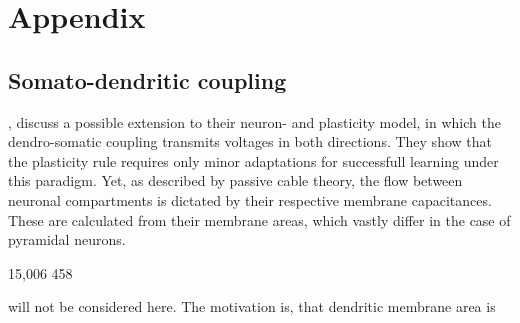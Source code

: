 
\chapter{Appendix}



\section{Somato-dendritic coupling}\label{sec-somato-dendr}

\cite{urbanczik2014learning}, discuss a possible extension to their neuron- and plasticity
model, in which the dendro-somatic coupling transmits voltages in both directions. They show
that the plasticity rule requires only minor adaptations for successfull learning under this paradigm. Yet, as described
by passive cable theory, the flow between neuronal compartments is dictated by their respective membrane capacitances.
These are calculated from their membrane areas, which vastly differ in the case of pyramidal neurons. 


15,006
458


will not be considered 
here. The motivation is, that dendritic membrane area is  